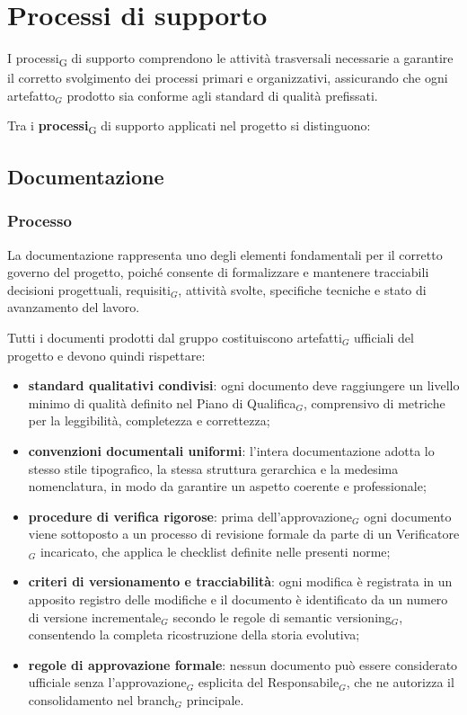 \documentclass[a4paper, 10pt]{article}
\begin{document}
\section{Processi di supporto}
I processi\textsubscript{G} di supporto comprendono le attività trasversali necessarie a garantire il corretto svolgimento dei processi primari e organizzativi, assicurando che ogni artefatto$_G$ prodotto sia conforme agli standard di qualità prefissati.

Tra i \textbf{processi}\textsubscript{G} di supporto applicati nel progetto si distinguono:

\subsection{Documentazione}
\label{subsec:documentazione}

\subsubsection{Processo}

La documentazione rappresenta uno degli elementi fondamentali per il corretto governo del progetto, poiché consente di formalizzare e mantenere tracciabili decisioni progettuali, requisiti$_G$, attività svolte, specifiche tecniche e stato di avanzamento del lavoro.

Tutti i documenti prodotti dal gruppo costituiscono artefatti$_G$ ufficiali del progetto e devono quindi rispettare:
\begin{itemize}
    \item \textbf{standard qualitativi condivisi}: ogni documento deve raggiungere un livello minimo di qualità definito nel Piano di Qualifica$_G$, comprensivo di metriche per la leggibilità, completezza e correttezza;
    \item \textbf{convenzioni documentali uniformi}: l'intera documentazione adotta lo stesso stile tipografico, la stessa struttura gerarchica e la medesima nomenclatura, in modo da garantire un aspetto coerente e professionale;
    \item \textbf{procedure di verifica rigorose}: prima dell'approvazione$_G$ ogni documento viene sottoposto a un processo di revisione formale da parte di un Verificatore$_G$ incaricato, che applica le checklist definite nelle presenti norme;
    \item \textbf{criteri di versionamento e tracciabilità}: ogni modifica è registrata in un apposito registro delle modifiche e il documento è identificato da un numero di versione incrementale$_G$ secondo le regole di semantic versioning$_G$, consentendo la completa ricostruzione della storia evolutiva;
    \item \textbf{regole di approvazione formale}: nessun documento può essere considerato ufficiale senza l'approvazione$_G$ esplicita del Responsabile$_G$, che ne autorizza il consolidamento nel branch$_G$ principale.
\end{itemize}
\end{document}
